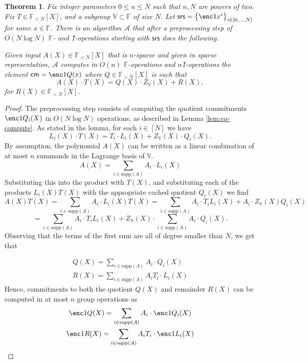 \documentclass[11pt]{article} %
\newcommand{\alg}{\ensuremath{\mathscr{A}}\xspace}
\newcommand{\F}{\ensuremath{\mathbb F}\xspace}
\newcommand{\srs}{\ensuremath{\mathsf{srs}}\xspace}
\newcommand{\cm}{\ensuremath{\mathsf{cm}}\xspace}
\newcommand{\sett}[2]{\ensuremath{\set{#1}_{#2}}\xspace}
\newcommand{\set}[1]{\ensuremath{\left\{#1\right\}}\xspace}
\newcommand{\polysofdeg}[1]{\ensuremath{\F_{< #1}[X]}\xspace}
\newtheorem{thm}[lemma]{Theorem}
\newcommand{\bigspace}{\ensuremath{\mathbb{V}}\xspace}
\newcommand{\witsize}{\ensuremath{n}\xspace}
\newcommand{\tabsize}{\ensuremath{N}\xspace}
\newcommand{\tabruntime}{\ensuremath{\tabsize\log\tabsize}\xspace}
\newcommand{\supp}[1]{\ensuremath{\mathrm{supp}(#1)}\xspace}
\begin{document}
\begin{thm}
Fix integer parameters $0\leq n\leq N$ such that $n,N$ are powers of two. Fix $T\in \polysofdeg{\tabsize}$, and a subgroup $\bigspace\subset \F$ of size \tabsize. Let $\srs=\sett{\enc1{x^i}}{i\in[0,\ldots,\tabsize]}$ for some $x\in \F$. 
There is an algorithm \alg that after a preprocessing step of $O(\tabruntime)$ \F- and \G1-operations starting with \srs does the following.


Given input $A(X)\in \polysofdeg{\tabsize}$ that is \witsize-sparse and given in sparse representation, \alg computes in 
$O(\witsize)$ \F-operations and \witsize \G1-operations the element
$\cm=\enc1{Q(x)}$ where $Q\in \polysofdeg{\tabsize}$ is such that
\[A(X)\cdot T(X) = Q(X)\cdot Z_{\bigspace}(X) + R(X),\]
for $R(X)\in \polysofdeg{\tabsize}$.
\end{thm}
\begin{proof}
    The preprocessing step consists of computing the quotient commitments $\enc1{Q_i(X)}$ in $O(\tabruntime)$ operations, as described in Lemma \ref{lem:cq-compute}. As stated in the lemma,
    for each $i\in[\tabsize]$ we have
    \[L_i(X)\cdot T(X)=T_i\cdot L_i(X) + Z_\bigspace(X)\cdot Q_i(X).\]
    By assumption, the polynomial $A(X)$ can be written as a linear combination of
    at most $\witsize$ summands in the Lagrange basis of $\bigspace$.
    \[ A(X) = \sum_{i \in \supp{A}} A_i\cdot L_i(X) \]
    Substituting this into the product with $T(X)$, and substituting each of the products
    $L_i(X) T(X)$ with the appropriate cached quotient $Q_i(X)$ we find
    \[ A(X) T(X) = \sum_{i\in \supp{A}} A_i\cdot  L_i(X) T(X) =\sum_{i \in
    \supp{A}} A_i \cdot T_i L_i(X) + A_i\cdot Z_\bigspace(X) Q_i(X) \] 
   \[=\sum_{i \in  \supp{A}} A_i \cdot T_i L_i(X) +Z_\bigspace(X)\cdot \sum_{i \in
    \supp{A}} A_i \cdot Q_i(X).\] 
Observing that the terms of the first sum are all of degree smaller than \tabsize, we get that

    \begin{gather*}
Q(X)=\sum_{i \in  \supp{A}} A_i \cdot Q_i(X) \\
        R(X) = \sum_{i \in \supp{A}} A_i T_i \cdot L_i(X)
    \end{gather*}
    Hence, commitments to both the quotient $Q(X)$ and remainder $R(X)$ can be computed in
   at most \witsize group operations as 
    \begin{gather*}
        \enc1{Q(X)} = \sum_{i \in \supp{A}} A_i \cdot \enc1{Q_i(X)} \\
        \enc1{R(X)} = \sum_{i \in \supp{A}} A_i T_i \cdot \enc1{L_i(X)}
    \end{gather*}
\end{proof}
\end{document}
